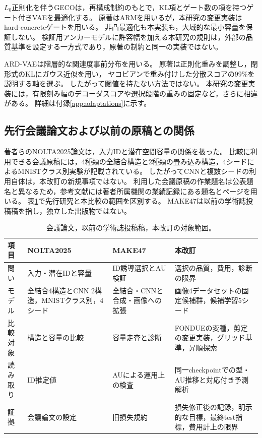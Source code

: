 \documentclass[11pt,a4paper]{ltjsarticle}
\begin{document}
$L_0$正則化を伴うGECOは，再構成制約のもとで，KL項とゲート数の項を持つゲート付きVAEを最適化する\cite{deboom2020geco,rezende2018geco}。
原著はARMを用いるが，本研究の変更実装はhard-concreteゲートを用いる\cite{louizos2018l0}。
非凸最適化も本実装も，大域的な最小容量を保証しない。
検証用アンカーモデルに許容幅を加える本研究の規則は，外部の品質基準を設定する一方式であり，原著の制約と同一の実装ではない。

ARD-VAEは階層的な関連度事前分布を用いる\cite{saha2025ardvae}。
原著は正則化重みを調整し，閉形式のKLにガウス近似を用い，
ヤコビアンで重み付けした分散スコアの99\%を説明する軸を選ぶ。
したがって閾値を持たない方法ではない。
本研究の変更実装には，有限刻み幅のデコーダスコアや選択段階の重みの固定など，さらに相違がある。
詳細は付録\ref{app:adaptations}に示す。

\subsection{先行会議論文および以前の原稿との関係}
著者らのNOLTA2025論文\cite{obata2025manifold}は，入力IDと潜在空間容量の関係を扱った。
比較に利用できる会議原稿には，4種類の全結合構造と2種類の畳み込み構造，4シードによるMNISTクラス別実験が記載されている。
したがってCNNと複数シードの利用自体は，本改訂の新規事項ではない。
利用した会議原稿の作業題名は公表題名と異なるため，参考文献には著者所属機関の業績記録にある題名とページを用いる。
表\ref{tab:history}で先行研究と本比較の範囲を区別する。
MAKE47は以前の学術誌投稿稿を指し，独立した出版物ではない。

\begin{table}[H]
\caption{会議論文，以前の学術誌投稿稿，本改訂の対象範囲。}
\label{tab:history}\small
\begin{tabularx}{\textwidth}{lXXX}\toprule
項目 & NOLTA2025 & MAKE47 & 本改訂 \\\midrule
問い & 入力・潜在IDと容量 & ID誘導選択とAU検証 & 選択の品質，費用，診断の限界 \\
モデル & 全結合4構造とCNN 2構造，MNISTクラス別，4シード & 全結合・CNNと合成・画像への拡張 & 画像4データセットの固定候補群，候補学習5シード \\
比較対象 & 構造と容量の比較 & 容量走査と診断 & FONDUEの変種，剪定の変更実装，グリッド基準，昇順探索 \\
読み取り & ID推定値 & AUによる運用上の検査 & 同一checkpointでの型・AU推移と対応付き予測解析 \\
証拠 & 会議論文の設定 & 旧損失規約 & 損失修正後の記録，明示的な目標，最終test指標，費用計上の限界 \\
\bottomrule\end{tabularx}
\end{table}
\end{document}
